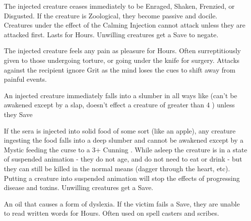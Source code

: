 {  \CHYMISTRY[
    Name=Al-Farabi's Calming Injection,
    Link=chymistry-al-farabis-calming-injection,
    Cost=Gold (5),
    Duration=0 ,
    Toxin=Yes,
    Narcotic=No 
  ]

  The injected creature ceases immediately to be Enraged, Shaken, Frenzied, or Disgusted.  If the creature is Zoological, they become passive and docile.  Creatures under the effect of the Calming Injection cannot attack unless they are attacked first.  Lasts for Hours. Unwilling creatures get a Save to negate.

  \CHYMISTRY[
    Name=Davy's Soothing Anesthetic,
    Link=chymistry-davys-soothing-anesthetic,
    Cost=Silver (3),
    Duration=0 ,
    Toxin=Yes,
    Narcotic=No 
  ]

  The injected creature feels any pain as pleasure for Hours.  Often surreptitiously given to those undergoing torture, or going under the knife for surgery.  Attacks against the recipient ignore Grit as the mind loses the cues to shift away from painful events.  


  \CHYMISTRY[
    Name=Grimm's Stupurous Preparation,
    Link=chymistry-grimms-stupurous-preparation,
    Cost=Gold (5),
    Duration=0 ,
    Toxin=Yes,
    Narcotic=No 
  ]


  An injected creature immediately falls into a slumber in all ways like  (can't be awakened except by a slap, doesn't effect a creature of greater than 4 \HD) unless they Save

  If the sera is injected into solid food of some sort (like an apple), any creature ingesting the food falls into a deep slumber and cannot be awakened except by a Mystic feeding the curse to a 3+ Cunning . While asleep the creature is in a state of suspended animation - they do not age, and do not need to eat or drink - but they can still be killed in the normal means (dagger through the heart, etc).  Putting a creature into suspended animation will stop the effects of progressing disease and toxins.  Unwilling creatures get a Save. 

  \CHYMISTRY[
    Name=Wordwarp,
    Link=chymistry-wordwarp,
    Cost=Gold (5),
    Duration=0 ,
    Toxin=Yes,
    Narcotic=No 
  ]

  An oil that causes a form of dyslexia.  If the victim fails a Save, they are unable to read written words for Hours.  Often used on spell casters and scribes.


\newpage

}
